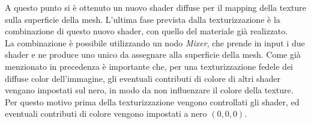 A questo punto si è ottenuto un nuovo shader diffuse per il mapping della texture sulla superficie della mesh. L’ultima fase prevista dalla texturizzazione è la combinazione di questo nuovo shader, con quello del materiale già realizzato. 
\\
La combinazione è possibile utilizzando un nodo \emph{Mixer}, che prende in input i due shader e ne produce uno unico da assegnare alla superficie della mesh. Come già menzionato in precedenza è importante che, per una texturizzazione fedele dei diffuse color dell’immagine, gli eventuali contributi di colore di altri shader vengano impostati sul nero, in modo da non influenzare il colore della texture. Per questo motivo prima della texturizzazione vengono controllati gli shader, ed eventuali contributi di colore vengono impostati a nero $(0,0,0)$. 